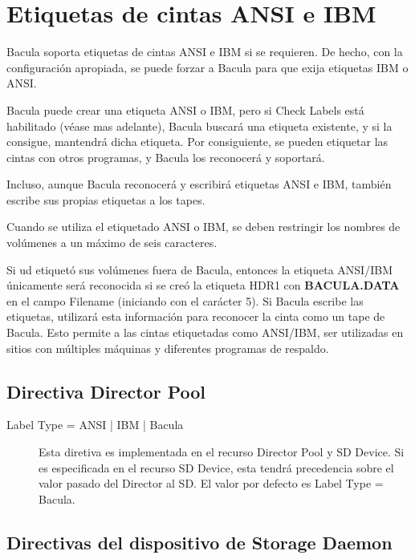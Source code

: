 ﻿
\chapter{Etiquetas de cintas ANSI e IBM}
\label{AnsiLabelsChapter}

Bacula soporta etiquetas de cintas ANSI e IBM si se requieren.
De hecho, con la configuración apropiada, se puede forzar
a Bacula para que exija etiquetas IBM o ANSI.

Bacula puede crear una etiqueta ANSI o IBM, pero si Check Labels
está habilitado (véase mas adelante), Bacula buscará una etiqueta existente, y
si la consigue, mantendrá dicha etiqueta. Por consiguiente, se pueden 
etiquetar las cintas con otros programas, y Bacula los reconocerá 
y soportará.

Incluso, aunque Bacula reconocerá y escribirá etiquetas ANSI e IBM, 
también escribe sus propias etiquetas a los tapes.

Cuando se utiliza el etiquetado ANSI o IBM, se deben restringir
los nombres de volúmenes a un máximo de seis caracteres.

Si ud etiquetó sus volúmenes fuera de Bacula, entonces la 
etiqueta ANSI/IBM únicamente será reconocida si se creó la etiqueta
HDR1 con {\bf BACULA.DATA} en el campo Filename (iniciando con 
el carácter 5). Si Bacula escribe las etiquetas, utilizará 
esta información para reconocer la cinta como un tape de Bacula.
Esto permite a las cintas etiquetadas como ANSI/IBM, ser utilizadas en
sitios con múltiples máquinas y diferentes programas de respaldo.

\section{Directiva Director Pool}

\begin{description}
\item [ Label Type = ANSI | IBM | Bacula]  
  Esta diretiva es implementada en el recurso Director Pool y SD Device.
  Si es especificada en el recurso SD Device, esta tendrá precedencia 
  sobre el valor pasado del Director al SD. El valor por defecto es 
  Label Type = Bacula.
\end{description}

\section{Directivas del dispositivo de Storage Daemon}

